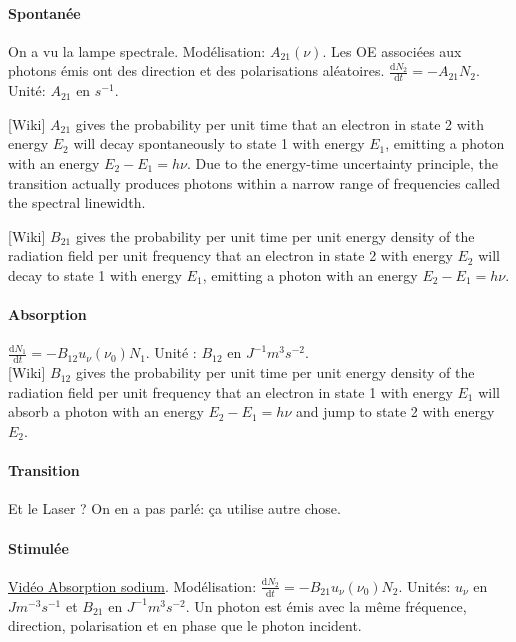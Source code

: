 \documentclass[11pt]{report}
\numberwithin{figure}{section}
\numberwithin{equation}{section}
\numberwithin{table}{section}
\newcommand{\ud}{\mathrm{d}}
\newcommand{\1}{\boldsymbol{1}}
\begin{document}
\paragraph{Spontanée} On a vu la lampe spectrale. Modélisation: $A_{21}(\nu)$. Les OE associées aux photons émis ont des direction et des polarisations aléatoires. $\frac{\ud N_2}{\ud t} = - A_{21} N_2$. Unité: $A_{21}$ en $s^{-1}$.

[Wiki] $A_{21}$ gives the probability per unit time that an electron in state 2 with energy $E_2$ will decay spontaneously to state 1 with energy $E_1$, emitting a photon with an energy $E_2 - E_1 = h\nu$. Due to the energy-time uncertainty principle, the transition actually produces photons within a narrow range of frequencies called the spectral linewidth.

[Wiki] $B_{21}$ gives the probability per unit time per unit energy density of the radiation field per unit frequency that an electron in state 2 with energy $E_{2}$ will decay to state 1 with energy $E_{1}$, emitting a photon with an energy $E_2 - E_1 = h\nu$.

\paragraph{Absorption} $\frac{\ud N_1}{\ud t} = - B_{12} u_\nu(\nu_0) N_1$. Unité :  $B_{12}$ en $J^{-1} m^{3} s^{-2}$. \\

[Wiki] $B_{12}$ gives the probability per unit time per unit energy density of the radiation field per unit frequency that an electron in state 1 with energy $E_{1}$ will absorb a photon with an energy $E_2 - E_1 = h\nu$ and jump to state 2 with energy $E_{2}$.  \\

\paragraph{Transition} Et le Laser ? On en a pas parlé: ça utilise autre chose. 
 
\paragraph{Stimulée} \href{https://www.youtube.com/watch?v=7u3rRy97m9Y&t=19s}{Vidéo Absorption sodium}. Modélisation: $\frac{\ud N_2}{\ud t} = - B_{21} u_\nu(\nu_0) N_2$. Unités: $u_\nu$ en $J m^{-3} s^{-1}$ et $B_{21}$ en $J^{-1} m^{3} s^{-2}$. Un photon est émis avec la même fréquence, direction, polarisation et en phase que le photon incident.
\end{document}
